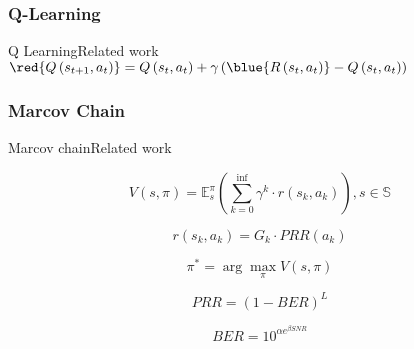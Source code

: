 \subsubsection{Q-Learning}
\begin{frame}{Q Learning}{Related work}
	$\red{Q\left(s_{t+1}, a_{t}\right)}=Q\left(s_{t}, a_{t}\right)+\gamma\left(\blue{R\left(s_{t}, a_{t}\right)}-Q\left(s_{t}, a_{t}\right)\right)$

\end{frame}


\subsubsection{Marcov Chain}

\begin{frame}{Marcov chain}{Related work}

\begin{flushleft}
\begin{equation}
V(s, \pi)=\mathbb{E}_{s}^{\pi}\left(\sum_{k=0}^{\mathrm{inf}} \gamma^{k} \cdot r\left(s_{k}, a_{k}\right)\right), s \in \mathbb{S}
\end{equation}

\begin{equation}
r\left(s_{k}, a_{k}\right)=G_{k} \cdot P R R\left(a_{k}\right)
\end{equation}

\begin{equation}
\pi^{*}=\arg \max _{\pi} V(s, \pi)
\end{equation}


\begin{equation}
PRR=(1-BER)^{L}
\end{equation}

\begin{equation}
BER=10^{\alpha e^{\beta SNR}}
\end{equation}

\end{flushleft}

\end{frame}

